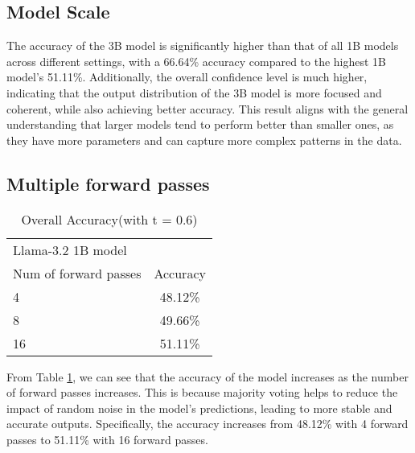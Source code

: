\documentclass[
	a4paper, %
	10pt, %
	twoside, %
]{LTJournalArticle}
\begin{document}
\subsection{Model Scale}

The accuracy of the 3B model is significantly higher than that of all 1B models across different settings, with a 66.64\% accuracy compared to the highest 1B model's 51.11\%. Additionally, the overall confidence level is much higher, indicating that the output distribution of the 3B model is more focused and coherent, while also achieving better accuracy. This result aligns with the general understanding that larger models tend to perform better than smaller ones, as they have more parameters and can capture more complex patterns in the data.

\subsection{Multiple forward passes}

\begin{table} %
	\centering
	\begin{tabular}{l c}
		\toprule
		\multicolumn{2}{l}{Llama-3.2 1B model} \\
		\cmidrule(r){1-1}
		Num of forward passes  & Accuracy \\
		\midrule
		4 &  48.12\% \\
		8 &  49.66\% \\
		16 &  51.11\% \\
		\bottomrule
	\end{tabular}
	\caption{Overall Accuracy(with t = 0.6)}
	\label{tab:accuracy}
\end{table}

From Table \ref{tab:accuracy}, we can see that the accuracy of the model increases as the number of forward passes increases. This is because majority voting helps to reduce the impact of random noise in the model's predictions, leading to more stable and accurate outputs. Specifically, the accuracy increases from 48.12\% with 4 forward passes to 51.11\% with 16 forward passes.


\printbibliography %

\end{document}
